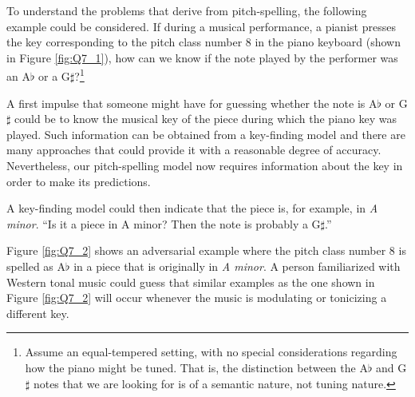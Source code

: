

To understand the problems that derive from pitch-spelling,
the following example could be considered. If during a
musical performance, a pianist presses the key corresponding
to the pitch class number 8 in the piano keyboard (shown in
Figure  \ref{fig:Q7_1}), how can we know if the note played
by the performer was an A$\flat$ or a
G$\sharp$?\footnote{Assume an equal-tempered setting, with
no special considerations regarding how the piano might be
tuned. That is, the distinction between the A$\flat$ and
G$\sharp$ notes that we are looking for is of a semantic
nature, not tuning nature.}


A first impulse that someone might have for guessing whether
the note is A$\flat$ or G$\sharp$ could be to know the
musical key of the piece during which the piano key was
played. Such information can be obtained from a key-finding
model and there are many approaches that could provide it
with a reasonable degree of accuracy. Nevertheless, our
pitch-spelling model now requires information about the key
in order to make its predictions.

A key-finding model could then indicate that the piece is,
for example, in \emph{A minor}. ``Is it a piece in A minor?
Then the note is probably a G$\sharp$.''


Figure \ref{fig:Q7_2} shows an adversarial example where the
pitch class number 8 is spelled as A$\flat$ in a piece that
is originally in \emph{A minor}. A person familiarized with
Western tonal music could guess that similar examples as the
one shown in Figure \ref{fig:Q7_2} will occur whenever the
music is modulating or tonicizing a different key.

